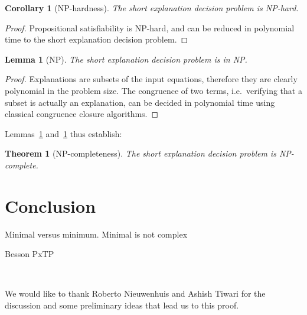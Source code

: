 \documentclass{easychair}
\newtheorem{corollary}{Corollary}
\newtheorem{theorem}{Theorem}
\newtheorem{lemma}{Lemma}
\begin{document}
\begin{corollary}[NP-hardness]
\label{lemma:nphardness}
The short explanation decision problem is NP-hard.
\end{corollary}
\begin{proof}
Propositional satisfiability is NP-hard, and can be reduced in polynomial time
to the short explanation decision problem.
\end{proof}

\begin{lemma}[NP]
\label{lemma:innp}
The short explanation decision problem is in NP.
\end{lemma}
\begin{proof}
Explanations are subsets of the input equations, therefore they are clearly
polynomial in the problem size.  The congruence of two terms, i.e.\ verifying
that a subset is actually an explanation, can be decided in polynomial
time using classical congruence closure algorithms.
\end{proof}

Lemmas~\ref{lemma:nphardness} and~\ref{lemma:innp} thus establish:

\begin{theorem}[NP-completeness]
The short explanation decision problem is NP-complete.
\end{theorem}

\section*{Conclusion}

Minimal versus minimum.  Minimal is not complex

Besson PxTP

~\cite{Fontaine1}

We would like to thank Roberto Nieuwenhuis and Ashish Tiwari for the discussion
and some preliminary ideas that lead us to this proof.



\end{document}
